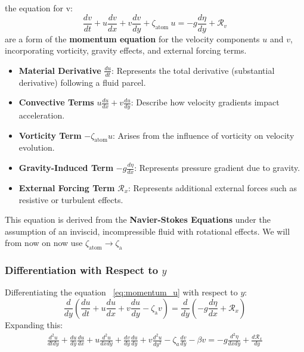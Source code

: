 \documentclass[12pt]{article}
\begin{document}
    the equation for v:
    \begin{equation}
        \frac{d v}{d t}+u \frac{d v}{d x}+v \frac{d v}{d y}+\zeta_{\text {atom }} u=-g \frac{d \eta}{d y}+\mathcal{R}_v\label{eq:momentum_v}
    \end{equation}
    are a form of the \textbf{momentum equation} for the velocity components $u$ and $v$, incorporating vorticity, gravity effects, and external
    forcing
    terms.

    \begin{itemize}
        \item \textbf{Material Derivative} $\frac{d u}{d t}$: Represents the total derivative (substantial derivative) following a fluid parcel.
        \item \textbf{Convective Terms} $u \frac{d u}{dx} + v \frac{d u}{dy}$: Describe how velocity gradients impact acceleration.
        \item \textbf{Vorticity Term} $-\zeta_\text{atom} u$: Arises from the influence of vorticity on velocity evolution.
        \item \textbf{Gravity-Induced Term} $-g \frac{d \eta}{d x}$: Represents pressure gradient due to gravity.
        \item \textbf{External Forcing Term} $\mathcal{R}_x$: Represents additional external forces such as resistive or turbulent effects.
    \end{itemize}

    This equation is derived from the \textbf{Navier-Stokes Equations} under the assumption of an inviscid, incompressible fluid with rotational
    effects.
    We will from now on now use $\zeta_\text{atom} \rightarrow \zeta_\text{a} $

    \subsubsection*{Differentiation with Respect to $y$}
    Differentiating the equation ~\ref{eq:momentum_u} with respect to $y$:
    \begin{equation*}
        \frac{d}{dy} \left( \frac{d u}{d t} + u \frac{d u}{d x} + v \frac{d u}{d y} - \zeta_\text{a} v \right) = \frac{d}{dy} \left( - g
                                                                                                                                   \frac{d \eta}{d x} + \mathcal{R}_x \right)
    \end{equation*}
    Expanding this:
    \begin{align}
        \frac{d^2 u}{d t d y}+\frac{d u}{d y} \frac{d u}{d x}+u \frac{d^2 u}{d x d y}+\frac{d v}{d y} \frac{d u}{d y}+v \frac{d^2 u}{d y^2}-\zeta_a \frac{d v}{d y}-\beta v=-g \frac{d^2 \eta}{d x d y}+\frac{d \mathcal{R}_x}{d y}
    \end{align}
\end{document}
